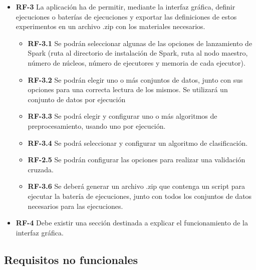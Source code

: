 \begin{itemize}
\item \textbf{RF-3} La aplicación ha de permitir, mediante la interfaz gráfica, definir ejecuciones o baterías de ejecuciones y exportar las definiciones de estos experimentos en un archivo .zip con los materiales necesarios.
	\begin{itemize}
		\item \textbf{RF-3.1} Se podrán seleccionar algunas de las opciones de lanzamiento de Spark (ruta al directorio de instalación de Spark, ruta al nodo maestro, número de núcleos, número de ejecutores y memoria de cada ejecutor).
		\item \textbf{RF-3.2} Se podrán elegir uno o más conjuntos de datos, junto con sus opciones para una correcta lectura de los mismos. Se utilizará un conjunto de datos por ejecución
		\item \textbf{RF-3.3} Se podrá elegir y configurar uno o más algoritmos de preprocesamiento, usando uno por ejecución.
		\item \textbf{RF-3.4} Se podrá seleccionar y configurar un algoritmo de clasificación.
		\item \textbf{RF-2.5} Se podrán configurar las opciones para realizar una validación cruzada.
		\item \textbf{RF-3.6} Se deberá generar un archivo .zip que contenga un script para ejecutar la batería de ejecuciones, junto con todos los conjuntos de datos necesarios para las ejecuciones.
	\end{itemize}

\item \textbf{RF-4} Debe existir una sección destinada a explicar el funcionamiento de la interfaz gráfica.

\end{itemize}

\subsection{Requisitos no funcionales}

